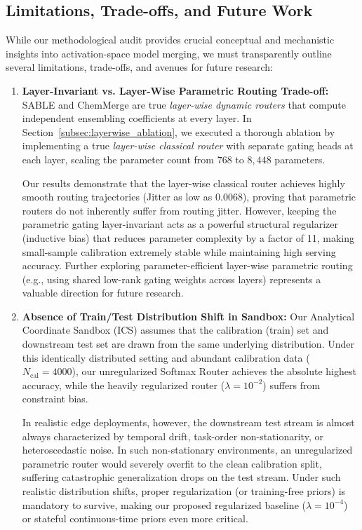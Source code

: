 \subsection{Limitations, Trade-offs, and Future Work}
\label{subsec:limitations_future_work}

While our methodological audit provides crucial conceptual and mechanistic insights into activation-space model merging, we must transparently outline several limitations, trade-offs, and avenues for future research:

\begin{enumerate}
    \item \textbf{Layer-Invariant vs. Layer-Wise Parametric Routing Trade-off:} SABLE and ChemMerge are true \emph{layer-wise dynamic routers} that compute independent ensembling coefficients at every layer. In Section~\ref{subsec:layerwise_ablation}, we executed a thorough ablation by implementing a true \emph{layer-wise classical router} with separate gating heads at each layer, scaling the parameter count from $768$ to $8,448$ parameters. 
    
    Our results demonstrate that the layer-wise classical router achieves highly smooth routing trajectories (Jitter as low as $0.0068$), proving that parametric routers do not inherently suffer from routing jitter. However, keeping the parametric gating layer-invariant acts as a powerful structural regularizer (inductive bias) that reduces parameter complexity by a factor of 11, making small-sample calibration extremely stable while maintaining high serving accuracy. Further exploring parameter-efficient layer-wise parametric routing (e.g., using shared low-rank gating weights across layers) represents a valuable direction for future research.
    
    \item \textbf{Absence of Train/Test Distribution Shift in Sandbox:} Our Analytical Coordinate Sandbox (ICS) assumes that the calibration (train) set and downstream test set are drawn from the same underlying distribution. Under this identically distributed setting and abundant calibration data ($N_{\text{cal}}=4000$), our unregularized Softmax Router achieves the absolute highest accuracy, while the heavily regularized router ($\lambda = 10^{-2}$) suffers from constraint bias. 
    
    In realistic edge deployments, however, the downstream test stream is almost always characterized by temporal drift, task-order non-stationarity, or heteroscedastic noise. In such non-stationary environments, an unregularized parametric router would severely overfit to the clean calibration split, suffering catastrophic generalization drops on the test stream. Under such realistic distribution shifts, proper regularization (or training-free priors) is mandatory to survive, making our proposed regularized baseline ($\lambda = 10^{-4}$) or stateful continuous-time priors even more critical.
    

\end{enumerate}
